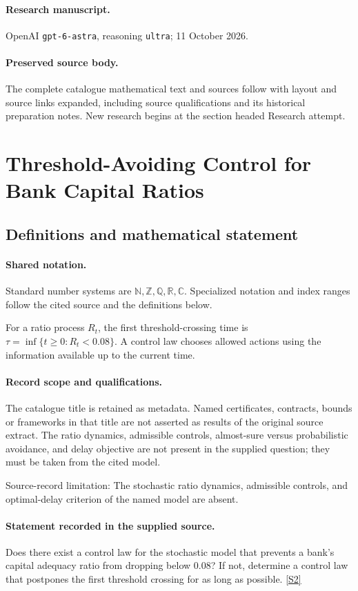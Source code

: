 \documentclass[11pt]{article}
\begin{document}
\paragraph{Research manuscript.} OpenAI \texttt{gpt-6-astra}, reasoning \texttt{ultra}; 11 October 2026.
\paragraph{Preserved source body.} The complete catalogue mathematical text and sources follow with layout and source links expanded, including source qualifications and its historical preparation notes. New research begins at the section headed Research attempt.

\section{Threshold-Avoiding Control for Bank Capital Ratios}\label{statement}

\subsection{Definitions and mathematical statement}

\paragraph{Shared notation.}Standard number systems are $\mathbb N,\mathbb Z,\mathbb Q,\mathbb R,\mathbb C$. Specialized notation and index ranges follow the cited source and the definitions below.


For a ratio process $R_t$, the first threshold-crossing time is $\tau=\inf\{t\geq0:R_t<0.08\}$. A control law chooses allowed actions using the information available up to the current time.
\paragraph{Record scope and qualifications.}
The catalogue title is retained as metadata. Named certificates, contracts, bounds or frameworks in that title are not asserted as results of the original source extract.
The ratio dynamics, admissible controls, almost-sure versus probabilistic avoidance, and delay objective are not present in the supplied question; they must be taken from the cited model.

Source-record limitation: The stochastic ratio dynamics, admissible controls, and optimal-delay criterion of the named model are absent.
\paragraph{Statement recorded in the supplied source.}
Does there exist a control law for the stochastic model that prevents a bank's capital adequacy ratio from dropping below $0.08$? If not, determine a control law that postpones the first threshold crossing for as long as possible. \href{https://doi.org/10.4171/owr/2005/11}{[S2]}
\end{document}
